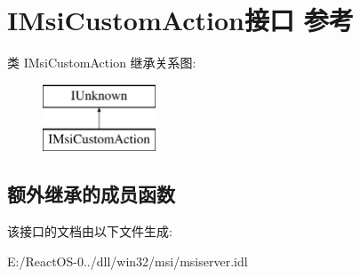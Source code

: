 \hypertarget{interface_i_msi_custom_action}{}\section{I\+Msi\+Custom\+Action接口 参考}
\label{interface_i_msi_custom_action}
类 I\+Msi\+Custom\+Action 继承关系图\+:\begin{figure}[H]
\begin{center}
\leavevmode
\includegraphics[height=2.000000cm]{interface_i_msi_custom_action}
\end{center}
\end{figure}
\subsection*{额外继承的成员函数}


该接口的文档由以下文件生成\+:\begin{DoxyCompactItemize}
\item 
E\+:/\+React\+O\+S-\/0../dll/win32/msi/msiserver.\+idl\end{DoxyCompactItemize}
